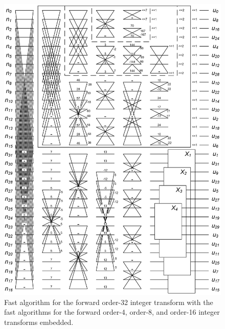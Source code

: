 \begin{figure}[h!]
     	\centering	
     	\includegraphics[width=\textwidth]{imm/dct/dct_2n.png}  
     	\caption{ Fast algorithm for the forward order-32 integer transform with the fast algorithms for the forward order-4, order-8, and order-16 integer transforms embedded. } 
     	\label{dct32}
\end{figure}  

        
